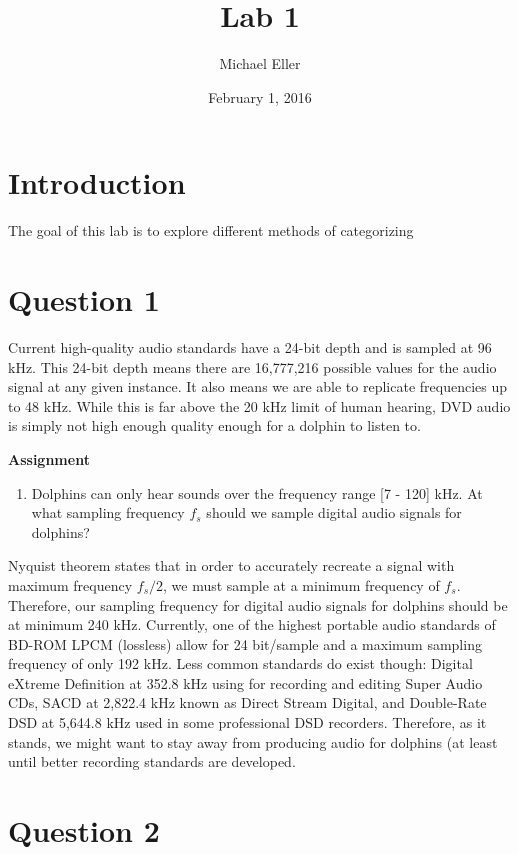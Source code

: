 \documentclass[11pt]{article} %
\title{Lab 1}
\author{Michael Eller}
\date{February 1, 2016} %
\begin{document}
\maketitle

\section{Introduction}
The goal of this lab is to explore different methods of categorizing 
\section{Question 1}
Current high-quality audio standards have a 24-bit depth and is sampled at 96 kHz. This 24-bit depth means there are 16,777,216 possible
values for the audio signal at any given instance. It also means we are able to replicate frequencies up to 48 kHz. While this is far
above the 20 kHz limit of human hearing, DVD audio is simply not high enough quality enough for a dolphin to listen to. 

\begin{framed}
\textbf{Assignment}
\begin{enumerate}
\item Dolphins can only hear sounds over the frequency range [7 - 120] kHz. At what sampling
frequency $f_s$ should we sample digital audio signals for dolphins?
\end{enumerate}
\end{framed}

Nyquist theorem states that in order to accurately recreate a signal with maximum frequency $f_s/2$, we must sample at a minimum frequency of $f_s$. 
Therefore, our sampling frequency for digital audio signals for dolphins should be at minimum 240 kHz. Currently, one of the highest portable audio
standards of BD-ROM LPCM (lossless) allow for 24 bit/sample and a maximum sampling frequency of only 192 kHz. Less common standards do
exist though: Digital eXtreme Definition at 352.8 kHz using for recording and editing Super Audio CDs, SACD at 2,822.4 kHz known as Direct Stream 
Digital, and Double-Rate DSD at 5,644.8 kHz used in some professional DSD recorders. 
Therefore, as it stands, we might want to stay away from producing audio for dolphins (at least until better recording standards are developed. 

\section{Question 2}
\end{document}
